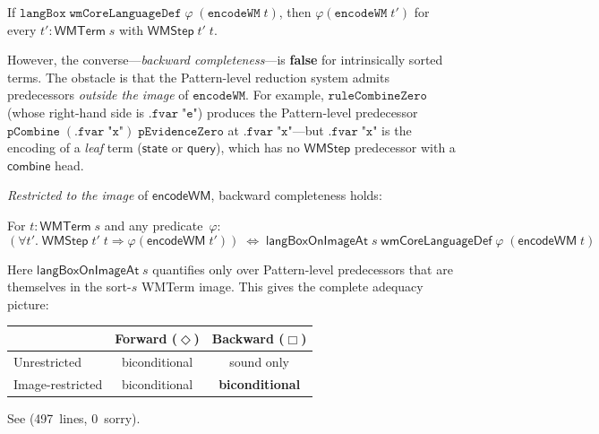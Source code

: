 \documentclass[11pt,openany]{report}
\begin{document}
\begin{theorem}
If $\mathtt{langBox}\;\mathtt{wmCoreLanguageDef}\;\varphi\;(\mathtt{encodeWM}\;t)$,
then $\varphi(\mathtt{encodeWM}\;t')$ for every
$t' : \mathsf{WMTerm}\;s$ with $\mathsf{WMStep}\;t'\;t$.
\end{theorem}

\noindent
However, the converse---\emph{backward completeness}---is \textbf{false}
for intrinsically sorted terms.
The obstacle is that the Pattern-level reduction system admits
predecessors \emph{outside the image} of $\mathtt{encodeWM}$.
For example, $\mathtt{ruleCombineZero}$ (whose right-hand side is
$\mathtt{.fvar}\;\texttt{"e"}$) produces the Pattern-level predecessor
$\mathtt{pCombine}\;(\mathtt{.fvar}\;\texttt{"x"})\;\mathtt{pEvidenceZero}$
at $\mathtt{.fvar}\;\texttt{"x"}$---but $\mathtt{.fvar}\;\texttt{"x"}$
is the encoding of a \emph{leaf} term ($\mathsf{state}$ or
$\mathsf{query}$), which has no $\mathsf{WMStep}$ predecessor with a
$\mathsf{combine}$ head.

\emph{Restricted to the image} of $\mathsf{encodeWM}$, backward
completeness holds:

\begin{theorem}
\label{thm:box-image}
For $t : \mathsf{WMTerm}\;s$ and any predicate~$\varphi$:
\[
(\forall t'.\; \mathsf{WMStep}\;t'\;t \Rightarrow \varphi(\mathsf{encodeWM}\;t'))
\;\Leftrightarrow\;
\mathsf{langBoxOnImageAt}\;s\;\mathsf{wmCoreLanguageDef}\;\varphi\;
(\mathsf{encodeWM}\;t)
\]
\end{theorem}

\noindent
Here $\mathsf{langBoxOnImageAt}\;s$ quantifies only over Pattern-level
predecessors that are themselves in the sort-$s$ WMTerm image.  This gives
the complete adequacy picture:
\begin{center}
\begin{tabular}{lcc}
\toprule
& Forward ($\Diamond$) & Backward ($\Box$) \\
\midrule
Unrestricted & biconditional & sound only \\
Image-restricted & biconditional & \textbf{biconditional} \\
\bottomrule
\end{tabular}
\end{center}

\noindent
See 
(497~lines, 0~sorry).

\end{document}

